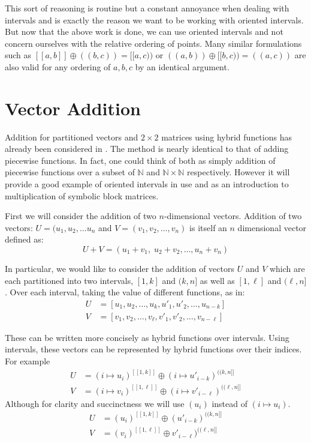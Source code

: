 This sort of reasoning is routine but a constant annoyance when dealing with intervals 
and is exactly the reason we want to be working with oriented intervals.
But now that the above work is done, we can use oriented intervals 
and not concern ourselves with the relative ordering of points.
Many similar formulations such as $[\![ a,b ]\!] \oplus (\!( b,c )\!) = [\![a,c)\!)$ or $(\!(a,b)\!) \oplus [\![b,c)\!) = (\!(a,c)\!)$ 
are also valid for any ordering of $a,b,c$ by an identical argument. 



%
%

\section{Vector Addition}
Addition for partitioned vectors and $2 \times 2$ matrices using hybrid functions has already been considered in \cite{sexton2008abstract, carette2010}.
The method is nearly identical to that of adding piecewise functions.
In fact, one could think of both as simply addition of piecewise functions over a subset of 
$\mathbb{N}$ and $\mathbb{N} \times \mathbb{N}$ respectively.
However it will provide a good example of oriented intervals in use and as an introduction to multiplication of 
symbolic block matrices.


First we will consider the addition of two $n$-dimensional vectors.
Addition of two vectors: $U= (u_1, u_2, \ldots u_n$ and $V = (v_1, v_2, \ldots, v_n)$ is itself an $n$ dimensional vector 
defined as:
\begin{equation}
	U+V = (u_1+v_1, \; u_2+v_2, \ldots, u_n+v_n)
\end{equation}


In particular, we would like to consider the addition of vectors $U$ and $V$ which are each partitioned into two intervals,
$[1,k]$ and $(k,n]$ as well as $[1,\ell]$ and $(\ell, n]$.
Over each interval, taking the value of different functions, as in:
\begin{align}
	U &= [ u_1, u_2, \ldots, u_{k}, u'_1, u'_2, \ldots, u_{n-k} ] \\
	V &= [ v_1, v_2, \ldots, v_{\ell}, v'_1, v'_2, \ldots, v_{n-\ell} ]
\end{align}


These can be written more concisely as hybrid functions over intervals. 
Using intervals, these vectors can be represented by hybrid functions over their indices.
For example
\begin{align}
	U &= (i \mapsto u_i)^{[\![1, k]\!]} \oplus (i \mapsto u'_{i-k})^{(\!(k,n]\!]} \\
	V &= (i \mapsto v_i)^{[\![1, \ell]\!]} \oplus (i \mapsto v'_{i-\ell})^{(\!(\ell,n]\!]}
\end{align}
Although for clarity and succinctness we will use $(u_i)$ instead of $(i \mapsto u_i)$.
\begin{align}
	U &= (u_i)^{[\![1, k]\!]} \oplus (u'_{i-k})^{(\!(k,n]\!]} \\
	V &= (v_i)^{[\![1, \ell]\!]} \oplus v'_{i-\ell})^{(\!(\ell,n]\!]}
\end{align}


